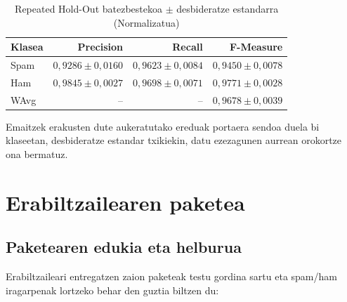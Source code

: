 \documentclass[12pt, a4paper]{article}
\begin{document}
\begin{table}[H]
    \centering
    \caption{Repeated Hold-Out batezbestekoa $\pm$ desbideratze estandarra (Normalizatua)}
    \begin{tabular}{lrrr}
        \toprule
        \textbf{Klasea} & \textbf{Precision} & \textbf{Recall} & \textbf{F-Measure} \\
        \midrule
        Spam & $0{,}9286 \pm 0{,}0160$ & $0{,}9623 \pm 0{,}0084$ & $0{,}9450 \pm 0{,}0078$ \\
        Ham  & $0{,}9845 \pm 0{,}0027$ & $0{,}9698 \pm 0{,}0071$ & $0{,}9771 \pm 0{,}0028$ \\
        WAvg & --                       & --                       & $0{,}9678 \pm 0{,}0039$ \\
        \bottomrule
    \end{tabular}
\end{table}

Emaitzek erakusten dute aukeratutako ereduak portaera sendoa duela bi klaseetan, desbideratze estandar txikiekin, datu ezezagunen aurrean orokortze ona bermatuz.

\newpage
\section{Erabiltzailearen paketea}

\subsection{Paketearen edukia eta helburua}

Erabiltzaileari entregatzen zaion paketeak testu gordina sartu eta spam/ham 
iragarpenak lortzeko behar den guztia biltzen du:
\end{document}
